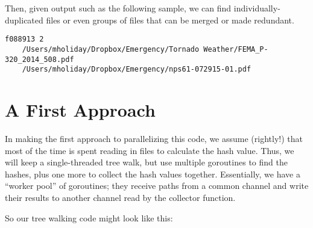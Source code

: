\documentclass[12pt,notitlepage]{article}
\begin{document}
Then, given output such as the following sample, we can find individually-duplicated
files or even groups of files that can be merged or made redundant.
\vspace{-0.4\baselineskip}
\begin{Verbatim}
f088913 2
    /Users/mholiday/Dropbox/Emergency/Tornado Weather/FEMA_P-320_2014_508.pdf
    /Users/mholiday/Dropbox/Emergency/nps61-072915-01.pdf
\end{Verbatim}

\section{A First Approach}
In making the first approach to parallelizing this code, we assume (rightly!) that
most of the time is spent reading in files to calculate the hash value. Thus,
we will keep a single-threaded tree walk, but use multiple goroutines to find
the hashes, plus one more to collect the hash values together. Essentially, we
have a ``worker pool'' of goroutines; they receive paths from a common channel
and write their results to another channel read by the collector function.

So our tree walking code might look like this:
\end{document}
